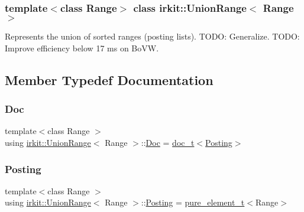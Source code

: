 \subsubsection*{template$<$class Range$>$\newline
class irkit\+::\+Union\+Range$<$ Range $>$}

Represents the union of sorted ranges (posting lists). T\+O\+DO\+: Generalize. T\+O\+DO\+: Improve efficiency below 17 ms on Bo\+VW. 

\subsection{Member Typedef Documentation}
\mbox{\label{classirkit_1_1UnionRange_a387589b1f09868b60485c4ab8c61f97a}} 
\subsubsection{\texorpdfstring{Doc}{Doc}}
{\footnotesize\ttfamily template$<$class Range $>$ \\
using \mbox{\hyperlink{classirkit_1_1UnionRange}{irkit\+::\+Union\+Range}}$<$ Range $>$\+::\mbox{\hyperlink{classirkit_1_1UnionRange_a387589b1f09868b60485c4ab8c61f97a}{Doc}} =  \mbox{\hyperlink{namespaceirkit_a595d83053e112c98ab2a1b65e5dd74be}{doc\+\_\+t}}$<$\mbox{\hyperlink{classirkit_1_1UnionRange_a5f694970419f5a60d7fd41d740556229}{Posting}}$>$\hspace{0.3cm}{\ttfamily [protected]}}

\mbox{\label{classirkit_1_1UnionRange_a5f694970419f5a60d7fd41d740556229}} 
\subsubsection{\texorpdfstring{Posting}{Posting}}
{\footnotesize\ttfamily template$<$class Range $>$ \\
using \mbox{\hyperlink{classirkit_1_1UnionRange}{irkit\+::\+Union\+Range}}$<$ Range $>$\+::\mbox{\hyperlink{classirkit_1_1UnionRange_a5f694970419f5a60d7fd41d740556229}{Posting}} =  \mbox{\hyperlink{namespaceirkit_afcffab67300c5c703cb38a363c9a6f1d}{pure\+\_\+element\+\_\+t}}$<$Range$>$\hspace{0.3cm}{\ttfamily [protected]}}

